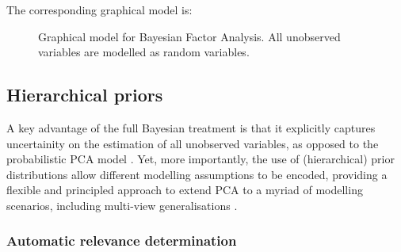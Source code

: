 The corresponding graphical model is:

\begin{figure}[H] 
	\centering
	
	\caption{Graphical model for Bayesian Factor Analysis. All unobserved variables are modelled as random variables.}
	\label{fig:bayesianFA}
\end{figure}


\subsection{Hierarchical priors}

A key advantage of the full Bayesian treatment is that it explicitly captures uncertainity on the estimation of all unobserved variables, as opposed to the probabilistic PCA model \cite{Bishop1999a,Bishop1999b}. Yet, more importantly, the use of (hierarchical) prior distributions allow different modelling assumptions to be encoded, providing a flexible and principled approach to extend PCA to a myriad of modelling scenarios, including multi-view generalisations \cite{Klami2008,Virtanen2012,Klami2015,Bunte2016,Khan2014,Zhao2016}.

\subsubsection{Automatic relevance determination} \label{section_ard}



